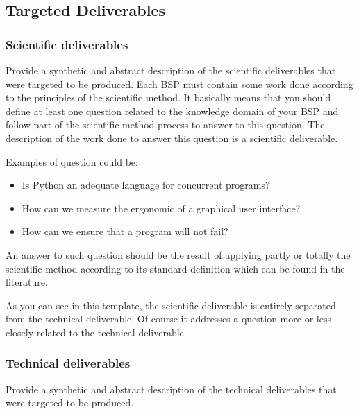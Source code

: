 \subsection{Targeted Deliverables}
\label{sec-deliverables}
\subsubsection{Scientific deliverables}
Provide a synthetic and abstract description of the scientific deliverables that were targeted to be produced. 
Each BSP must contain some work done according to the principles of the scientific method. It basically means that you should define at least one question related to the knowledge domain of your BSP and follow part of the scientific method process to answer to this question. The description of the work done to answer this question is a scientific deliverable.

Examples of question could be:
\begin{itemize}
	\item Is Python an adequate language for concurrent programs?
	\item How can we measure the ergonomic of a graphical user interface?
	\item How can we ensure that a program will not fail?
\end{itemize}

An answer to such question should be the result of applying partly or totally the scientific method according to its standard definition which can be found in the literature.

As you can see in this template, the scientific deliverable is entirely separated from the technical deliverable. Of course it addresses a question more or less closely related to the technical deliverable. 

\subsubsection{Technical deliverables}
Provide a synthetic and abstract description of the technical deliverables that were targeted to be produced. 
